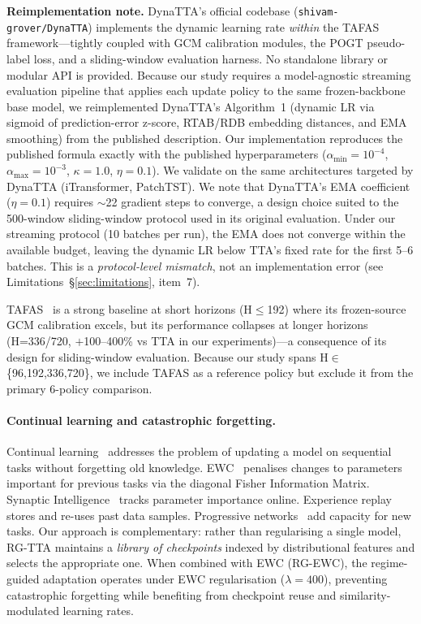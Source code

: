 \documentclass[11pt,a4paper]{article}
\begin{document}
\textbf{Reimplementation note.} DynaTTA's official codebase (\texttt{shivam-grover/DynaTTA}) implements the dynamic learning rate \emph{within} the TAFAS framework---tightly coupled with GCM calibration modules, the POGT pseudo-label loss, and a sliding-window evaluation harness. No standalone library or modular API is provided. Because our study requires a model-agnostic streaming evaluation pipeline that applies each update policy to the same frozen-backbone base model, we reimplemented DynaTTA's Algorithm~1 (dynamic LR via sigmoid of prediction-error z-score, RTAB/RDB embedding distances, and EMA smoothing) from the published description. Our implementation reproduces the published formula exactly with the published hyperparameters ($\alpha_{\min}=10^{-4}$, $\alpha_{\max}=10^{-3}$, $\kappa=1.0$, $\eta=0.1$). We validate on the same architectures targeted by DynaTTA (iTransformer, PatchTST). We note that DynaTTA's EMA coefficient ($\eta=0.1$) requires $\sim$22 gradient steps to converge, a design choice suited to the 500-window sliding-window protocol used in its original evaluation. Under our streaming protocol (10 batches per run), the EMA does not converge within the available budget, leaving the dynamic LR below TTA's fixed rate for the first 5--6 batches. This is a \emph{protocol-level mismatch}, not an implementation error (see Limitations~\S\ref{sec:limitations}, item~7).

TAFAS~\citep{kim2025tafas} is a strong baseline at short horizons (H$\leq$192) where its frozen-source GCM calibration excels, but its performance collapses at longer horizons (H=336/720, $+$100--400\% vs TTA in our experiments)---a consequence of its design for sliding-window evaluation. Because our study spans H$\in$\{96,192,336,720\}, we include TAFAS as a reference policy but exclude it from the primary 6-policy comparison.

\paragraph{Continual learning and catastrophic forgetting.}
Continual learning~\citep{parisi2019continual,mccloskey1989catastrophic} addresses the problem of updating a model on sequential tasks without forgetting old knowledge. EWC~\citep{kirkpatrick2017ewc} penalises changes to parameters important for previous tasks via the diagonal Fisher Information Matrix. Synaptic Intelligence~\citep{zenke2017continual} tracks parameter importance online. Experience replay~\citep{rolnick2019experience} stores and re-uses past data samples. Progressive networks~\citep{rusu2016progressive} add capacity for new tasks. Our approach is complementary: rather than regularising a single model, RG-TTA maintains a \emph{library of checkpoints} indexed by distributional features and selects the appropriate one. When combined with EWC (RG-EWC), the regime-guided adaptation operates under EWC regularisation ($\lambda = 400$), preventing catastrophic forgetting while benefiting from checkpoint reuse and similarity-modulated learning rates.
\end{document}
